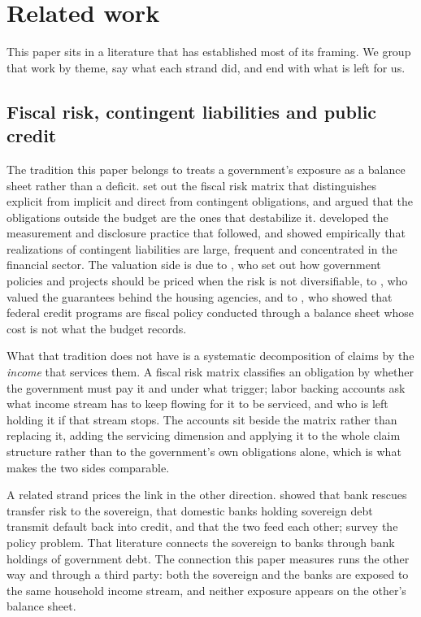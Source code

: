 \section{Related work}
\label{sec:related}

This paper sits in a literature that has established most of its framing. We group that work by
theme, say what each strand did, and end with what is left for us.

\subsection{Fiscal risk, contingent liabilities and public credit}

The tradition this paper belongs to treats a government's exposure as a balance sheet rather than
a deficit. \citet{Polackova1998} set out the fiscal risk matrix that distinguishes explicit from
implicit and direct from contingent obligations, and argued that the obligations outside the
budget are the ones that destabilize it. \citet{Cebotari2008} developed the measurement and
disclosure practice that followed, and \citet{BovaRuizArranzToscaniTure2019} showed empirically
that realizations of contingent liabilities are large, frequent and concentrated in the financial
sector. The valuation side is due to \citet{Lucas2012}, who set out how government policies and
projects should be priced when the risk is not diversifiable, to \citet{LucasMcDonald2010}, who
valued the guarantees behind the housing agencies, and to \citet{Lucas2016}, who showed that
federal credit programs are fiscal policy conducted through a balance sheet whose cost is not
what the budget records.

What that tradition does not have is a systematic decomposition of claims by the \emph{income}
that services them. A fiscal risk matrix classifies an obligation by whether the government must
pay it and under what trigger; labor backing accounts ask what income stream has to keep flowing
for it to be serviced, and who is left holding it if that stream stops. The accounts sit beside
the matrix rather than replacing it, adding the servicing dimension and applying it to the whole
claim structure rather than to the government's own obligations alone, which is what makes the
two sides comparable.

A related strand prices the link in the other direction. \citet{AcharyaDrechslerSchnabl2014}
showed that bank rescues transfer risk to the sovereign, \citet{GennaioliMartinRossi2014} that
domestic banks holding sovereign debt transmit default back into credit, and
\citet{FarhiTirole2018} that the two feed each other; \citet{DellAricciaEtAl2018} survey the
policy problem. That literature connects the sovereign to banks through bank holdings of
government debt. The connection this paper measures runs the other way and through a third party:
both the sovereign and the banks are exposed to the same household income stream, and neither
exposure appears on the other's balance sheet.

